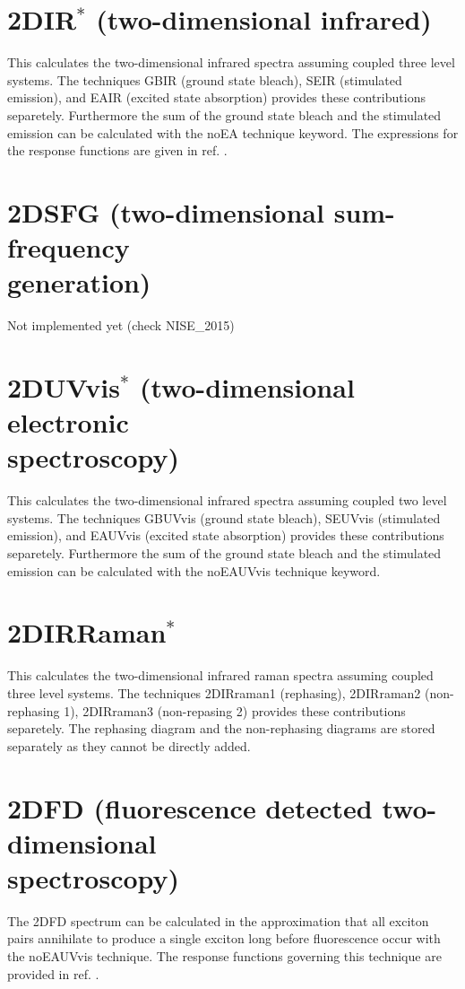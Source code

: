 \section{2DIR$^{*}$ (two-dimensional infrared)}
This calculates the two-dimensional infrared spectra assuming coupled three level systems. The techniques GBIR (ground state bleach), SEIR (stimulated emission), and EAIR (excited state absorption) provides these contributions separetely. Furthermore the sum of the ground state bleach and the stimulated emission can be calculated with the noEA technique keyword. The expressions for the response functions are given in ref. \cite{Jansen.2006.JPCB.110.22910}.
\section{2DSFG (two-dimensional sum-frequency\\ generation)}
 Not implemented yet (check NISE\_2015)
\section{2DUVvis$^{*}$ (two-dimensional electronic\\ spectroscopy)}
This calculates the two-dimensional infrared spectra assuming coupled two level systems. The techniques GBUVvis (ground state bleach), SEUVvis (stimulated emission), and EAUVvis (excited state absorption) provides these contributions separetely. Furthermore the sum of the ground state bleach and the stimulated emission can be calculated with the noEAUVvis technique keyword. 
\section{2DIRRaman$^{*}$}
This calculates the two-dimensional infrared raman spectra assuming coupled three level systems. The techniques 2DIRraman1 (rephasing), 2DIRraman2 (non-rephasing 1), 2DIRraman3 (non-repasing 2) provides these contributions separetely. The rephasing diagram and the non-rephasing diagrams are stored separately as they cannot be directly added. %
\section{2DFD (fluorescence detected two-dimensional\\ spectroscopy)}
 The 2DFD spectrum can be calculated in the approximation that all exciton pairs annihilate to produce a single exciton long before fluorescence occur with the noEAUVvis technique. The response functions governing this technique are provided in ref. \cite{Kunsel_2018}.
